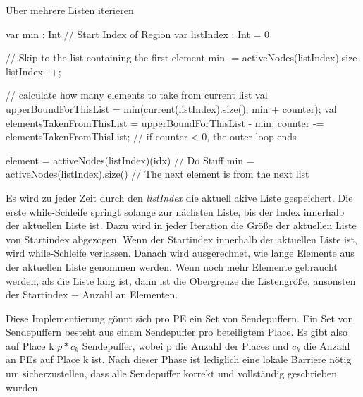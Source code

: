 \begin{algorithm}
	\caption{Über mehrere Listen iterieren}
	\label{alg:iterate_active_nodes}
	\begin{algorithmic}[1]
		\State var min : Int // Start Index of Region
		\State var listIndex : Int = 0

			// Skip to the list containing the first element
				\State min -= activeNodes(listIndex).size
				\State listIndex++;
			\EndWhile

			// calculate how many elements to take from current list
			\State val upperBoundForThisList = min(current(listIndex).size(), min + counter);
            \State val elementsTakenFromThisList = upperBoundForThisList - min;
            \State counter -= elementsTakenFromThisList; // if counter < 0, the outer loop ends

            	\State element = activeNodes(listIndex)(idx)
            	\State // Do Stuff
            \EndFor
            \State min = activeNodes(listIndex).size() // The next element is from the next list

		\EndFor
	\end{algorithmic}
\end{algorithm}
Es wird zu jeder Zeit durch den \textit{listIndex} die aktuell akive Liste gespeichert. Die erste while-Schleife springt solange zur nächsten Liste, bis der Index innerhalb der aktuellen Liste ist. Dazu wird in jeder Iteration die Größe der aktuellen Liste von Startindex abgezogen. Wenn der Startindex innerhalb der aktuellen Liste ist, wird while-Schleife verlassen. Danach wird ausgerechnet, wie lange Elemente aus der aktuellen Liste genommen werden. Wenn noch mehr Elemente gebraucht werden, als die Liste lang ist, dann ist die Obergrenze die Listengröße, ansonsten der Startindex + Anzahl an Elementen.

Diese Implementierung gönnt sich pro PE ein Set von Sendepuffern. Ein Set von Sendepuffern besteht aus einem Sendepuffer pro beteiligtem Place. Es gibt also auf Place k $p * c_k$ Sendepuffer, wobei p die Anzahl der Places und $c_k$ die Anzahl an PEs auf Place k ist. Nach dieser Phase ist lediglich eine lokale Barriere nötig um sicherzustellen, dass alle Sendepuffer korrekt und vollständig geschrieben wurden. 

